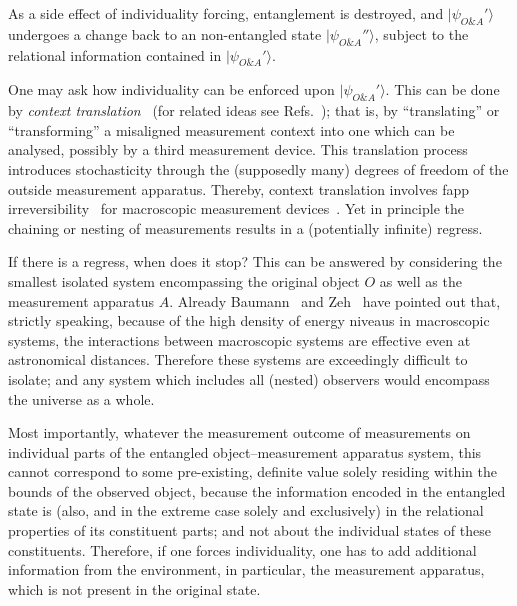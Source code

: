 \begin{enumerate}[(I)]
\begin{enumerate}[(i)]
\begin{enumerate}
As a side effect of individuality forcing, entanglement is destroyed, and $\vert \psi_{O\& A}' \rangle$ undergoes a
change back to an non-entangled state $\vert \psi_{O\& A}'' \rangle$,
subject to the relational information contained in $\vert \psi_{O\& A}' \rangle$.

One may ask how individuality can be enforced upon $\vert \psi_{O\& A}' \rangle$. This can be done by
{\em context translation}~\cite{svozil-2003-garda} (for related ideas see Refs.~\cite{svozil-2013-omelette,Quanta22});
that is, by ``translating'' or ``transforming'' a misaligned measurement context
into one which can be analysed, possibly by a third measurement device.
This translation process introduces stochasticity through the (supposedly many) degrees of freedom of the outside measurement apparatus.
Thereby, context translation involves fapp
irreversibility~\cite{Ludwig1953} for macroscopic measurement devices~\cite{engrt-sg-I,engrt-sg-II}.
Yet in principle the chaining or nesting of measurements results in a (potentially infinite) regress.

If there is a regress, when does it stop?
This can be answered by considering the smallest isolated system encompassing the original object $O$ as well as the measurement apparatus $A$.
Already Baumann~\cite{Baumann-70} and Zeh~\cite{Zeh1970}
have pointed out that, strictly speaking, because of the high density of energy niveaus in macroscopic systems, the interactions between macroscopic
systems are effective even at astronomical distances.
Therefore
these systems are exceedingly difficult to isolate; and
any system which includes all (nested) observers would encompass the
universe as a whole.




\end{enumerate}
\end{enumerate}

Most importantly, whatever the measurement outcome of measurements on individual parts of the entangled object--measurement apparatus system,
this cannot correspond to some pre-existing, definite value
solely residing within the bounds of the observed object, because the information encoded in the entangled state is (also, and in the extreme case solely and
exclusively) in the relational properties of its constituent parts; and not about the individual states of these constituents.
Therefore, if one forces individuality, one has to add additional information from the environment,
in particular, the measurement apparatus, which is not present in the original state.


\end{enumerate}
